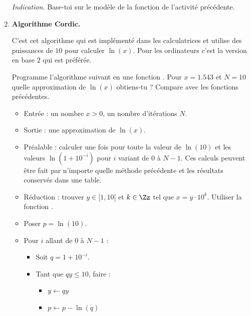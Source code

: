 \documentclass[11pt,class=report,crop=false]{standalone}
\begin{document}
\begin{activite}
\begin{enumerate}
    \emph{Indication.} Base-toi sur le modèle de la fonction  de l'activité précédente.
    
      
    
    \item \textbf{Algorithme Cordic.}
    
    C'est cet algorithme qui est implémenté dans les calculatrices et utilise des puissances de $10$ pour calculer $\ln(x)$. Pour les ordinateurs c'est la version en base $2$ qui est préférée.
    
    Programme l'algorithme suivant en une fonction . Pour $x = 1.543$ et $N=10$ quelle approximation de $\ln(x)$ obtiens-tu ? Compare avec les fonctions précédentes.
    
        \begin{algorithme}
  \sauteligne 
 \begin{itemize}
   \item Entrée : un nombre $x>0$, un nombre d'itérations $N$.
   
   \item Sortie : une approximation de $\ln(x)$. 
 
  \item Préalable : calculer une fois pour toute la valeur de $\ln(10)$ et
  les valeurs $\ln(1+10^{-i})$ pour $i$ variant de $0$ à $N-1$. Ces calculs peuvent être fait par n'importe quelle méthode précédente et les résultats conservés dans une table.
  
  \item Réduction : trouver $y \in [1,10[$ et $k \in \Zz$ tel que $x = y\cdot 10^k$. Utiliser la fonction 
    .
     
  \item Poser $p = \ln(10)$.

  \item Pour $i$ allant de $0$ à $N-1$ :
  \begin{itemize}
    \item Soit $q = 1+10^{-i}$.
    
    \item Tant que $qy \le 10$, faire :
    \begin{itemize}
      \item $y \leftarrow qy$
      \item $p \leftarrow p - \ln(q)$
    \end{itemize}

  \end{itemize}
  

\end{itemize}
\end{algorithme}
\end{enumerate}
\end{activite}
\end{document}
